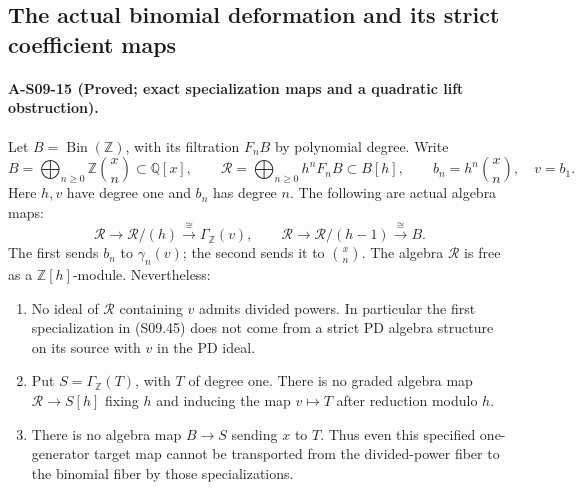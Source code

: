 \subsection{The actual binomial deformation and its strict coefficient maps}

\paragraph{A-S09-15 (Proved; exact specialization maps and a quadratic lift obstruction).}
Let $B=\operatorname{Bin}(\mathbb Z)$, with its filtration
$F_nB$ by polynomial degree.  Write
\[
 B=\bigoplus_{n\geq0}\mathbb Z\binom{x}{n}
       \subset\mathbb Q[x],\qquad
 \mathcal R=\bigoplus_{n\geq0}h^nF_nB\subset B[h],
 \qquad b_n=h^n\binom{x}{n},\quad v=b_1.
 \tag{S09.44}
\]
Here $h,v$ have degree one and $b_n$ has degree $n$.
The following are actual algebra maps:
\[
 \mathcal R\longrightarrow\mathcal R/(h)
        \xrightarrow{\ \cong\ }\Gamma_{\mathbb Z}(v),
 \qquad
 \mathcal R\longrightarrow\mathcal R/(h-1)
        \xrightarrow{\ \cong\ }B.
 \tag{S09.45}
\]
The first sends $b_n$ to $\gamma_n(v)$; the second
sends it to $\binom{x}{n}$.  The algebra $\mathcal R$
is free as a $\mathbb Z[h]$-module.  Nevertheless:

\begin{enumerate}
\item No ideal of $\mathcal R$ containing $v$ admits
divided powers.  In particular the first specialization
in (S09.45) does not come from a strict PD algebra
structure on its source with $v$ in the PD ideal.
\item Put $S=\Gamma_{\mathbb Z}(T)$, with $T$ of degree
one.  There is no graded algebra map
$\mathcal R\to S[h]$ fixing $h$ and inducing the
map $v\mapsto T$ after reduction modulo $h$.
\item There is no algebra map $B\to S$ sending $x$ to
$T$.  Thus even this specified one-generator target
map cannot be transported from the divided-power
fiber to the binomial fiber by those specializations.
\end{enumerate}

